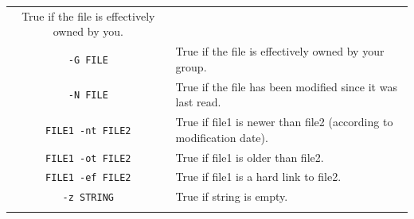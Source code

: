 \documentclass[doctor,openright,twoside]{sjtuthesis}
\newcommand{\passthrough}[1]{#1}
\theoremstyle{plain}
\theoremstyle{definition}
\theoremstyle{remark}
\theoremstyle{ocrenumbox}
\theoremstyle{plain}
\begin{document}
\begin{longtable}[]{@{}cl@{}}
\begin{minipage}[t]{0.74\columnwidth}
True if the file is effectively owned by you.\strut
\end{minipage}\tabularnewline
\begin{minipage}[t]{0.20\columnwidth}\centering
\passthrough{\lstinline!-G FILE!}\strut
\end{minipage} & \begin{minipage}[t]{0.74\columnwidth}\raggedright
True if the file is effectively owned by your group.\strut
\end{minipage}\tabularnewline
\begin{minipage}[t]{0.20\columnwidth}\centering
\passthrough{\lstinline!-N FILE!}\strut
\end{minipage} & \begin{minipage}[t]{0.74\columnwidth}\raggedright
True if the file has been modified since it was last read.\strut
\end{minipage}\tabularnewline
\begin{minipage}[t]{0.20\columnwidth}\centering
\passthrough{\lstinline!FILE1 -nt FILE2!}\strut
\end{minipage} & \begin{minipage}[t]{0.74\columnwidth}\raggedright
True if file1 is newer than file2 (according to modification date).\strut
\end{minipage}\tabularnewline
\begin{minipage}[t]{0.20\columnwidth}\centering
\passthrough{\lstinline!FILE1 -ot FILE2!}\strut
\end{minipage} & \begin{minipage}[t]{0.74\columnwidth}\raggedright
True if file1 is older than file2.\strut
\end{minipage}\tabularnewline
\begin{minipage}[t]{0.20\columnwidth}\centering
\passthrough{\lstinline!FILE1 -ef FILE2!}\strut
\end{minipage} & \begin{minipage}[t]{0.74\columnwidth}\raggedright
True if file1 is a hard link to file2.\strut
\end{minipage}\tabularnewline
\begin{minipage}[t]{0.20\columnwidth}\centering
\passthrough{\lstinline!-z STRING!}\strut
\end{minipage} & \begin{minipage}[t]{0.74\columnwidth}\raggedright
True if string is empty.\strut
\end{minipage}\tabularnewline
\begin{minipage}[t]{0.20\columnwidth}\centering

\end{minipage}
\end{longtable}
\end{document}
